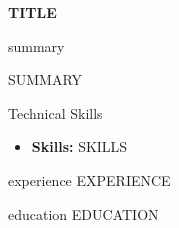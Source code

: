 \documentclass{resume}
\begin{document}
\makeheader
\begin{center}
 \textbf{ {{TITLE}} }\\
\end{center}
\begin{ResumeSection}{summary}
\begin{justify}
{{SUMMARY}}
\end{justify}
\end{ResumeSection}

\begin{ResumeSection}{Technical Skills}
  \begin{justify}
\begin{itemize}
    \item \textbf{Skills:} {{SKILLS}}
\end{itemize}
   \end{justify}
\end{ResumeSection}

\begin{ResumeSection}{experience}
    {{{EXPERIENCE}}}
\end{ResumeSection}

\begin{ResumeSection}{education}
    {{{EDUCATION}}}
\end{ResumeSection}
\end{document}
